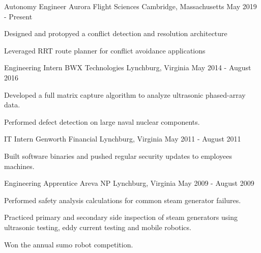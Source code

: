 

\begin{cventries}

  \cventry
    {Autonomy Engineer} %
    {Aurora Flight Sciences} %
    {Cambridge, Massachusetts} %
    {May 2019 - Present} %
    {
      \begin{cvitems}
        \item{Designed and protopyed a conflict detection and resolution architecture}
        \item{Leveraged RRT route planner for conflict avoidance applications}
      \end{cvitems}
    }

  \cventry
    {Engineering Intern}
    {BWX Technologies}
    {Lynchburg, Virginia}
    {May 2014 - August 2016}
    {
      \begin{cvitems}
        \item Developed a full matrix capture algorithm to analyze ultrasonic phased-array data.
        \item Performed defect detection on large naval nuclear components.
      \end{cvitems}
    }

  \cventry
    {IT Intern}
    {Genworth Financial}
    {Lynchburg, Virginia}
    {May 2011 - August 2011}
    {
      \begin{cvitems}
        \item Built software binaries and pushed regular security updates to employees machines.
      \end{cvitems}
    }

  \cventry
    {Engineering Apprentice}
    {Areva NP}
    {Lynchburg, Virginia}
    {May 2009 - August 2009}
    {
      \begin{cvitems}
        \item Performed safety analysis calculations for common steam generator failures.
        \item Practiced primary and secondary side inspection of steam generators using ultrasonic testing, eddy current testing and mobile robotics.
        \item Won the annual sumo robot competition.
      \end{cvitems}
    }

\end{cventries}
